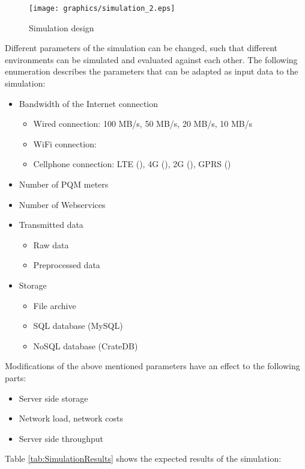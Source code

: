 \begin{figure}[h]
	\centering
		\texttt{[image: graphics/simulation\_2.eps]}
	\caption{Simulation design}
	\label{fig:simulation_design}
\end{figure}

Different parameters of the simulation can be changed, such that different environments can be simulated and evaluated against each other. The following enumeration describes the parameters that can be adapted as input data to the simulation:

\begin{itemize}
	\item Bandwidth of the Internet connection
		\begin{itemize}
			\item Wired connection: 100 MB/s, 50 MB/s, 20 MB/s, 10 MB/s
			\item WiFi connection: 
			\item Cellphone connection: LTE (), 4G (), 2G (), GPRS ()
		\end{itemize}
	\item Number of PQM meters
	\item Number of Webservices
	\item Transmitted data
		\begin{itemize}
			\item Raw data
			\item Preprocessed data
		\end{itemize}
  \item Storage
		\begin{itemize}
			\item File archive
			\item SQL database (MySQL)
			\item NoSQL database (CrateDB)
		\end{itemize}		
\end{itemize}

Modifications of the above mentioned parameters have an effect to the following parts:

\begin{itemize}
	\item Server side storage
	\item Network load, network costs
	\item Server side throughput
\end{itemize}

Table \ref{tab:SimulationResults} shows the expected results of the simulation:

